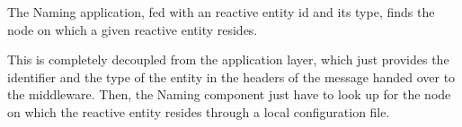 The Naming application, fed with an reactive
entity id and its type, finds the node on
which a given reactive entity resides.

This is completely decoupled from the application
layer, which just provides the identifier and the type of the entity in the
headers of the message handed over to the middleware. Then, the
Naming component just have to look up for the node on which the reactive
entity resides through a local configuration file.
